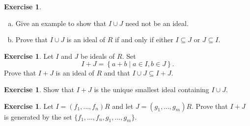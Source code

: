 \documentclass{amsart}
\theoremstyle{plain}
\theoremstyle{definition}
\newtheorem{definition}{Definition}
\newtheorem{exercise}[theorem]{Exercise}
\theoremstyle{definition}
\newcommand{\sse}{\subseteq}
\begin{document}

\begin{exercise}
\begin{enumerate}[a.]
\item Give an example to show that
$I \cup J$ need not be an ideal.
\item %
Prove that $I \cup J$ is an ideal of $R$ if and only if either $I \sse J$ or $J \sse
I$.
\end{enumerate}
\end{exercise}

\begin{exercise}
Let $I$ and $J$ be ideals of $R$.
Set
\[
I + J = \left\{ a + b \mid a \in I, b \in J \right\}.
\]
Prove that $I + J$ is an ideal of $R$ and that $I\cup J\sse I+J$.
\end{exercise}

\begin{exercise}
Show that $I + J$ is the unique smallest ideal containing $I\cup J$.
\end{exercise}

\begin{exercise}
Let $I = (f_{1}, \ldots, f_{n})R$ and let $J = (g_{1}, \ldots, g_{m})R$.  Prove that
$I + J$ is generated by the set $\{f_{1}, \ldots, f_{n}, g_{1}, \ldots, g_{m}\}$.
\end{exercise}
\end{document}
